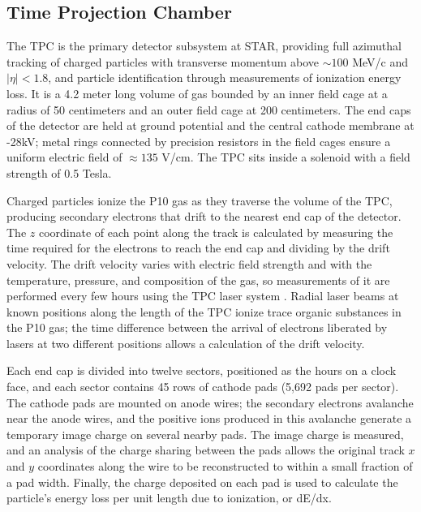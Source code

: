 
\subsection{Time Projection Chamber}

The TPC \cite{Anderson:2003ur} is the primary detector subsystem at STAR,
providing full azimuthal tracking of charged particles with transverse
momentum above $\sim 100$ MeV/c and $|\eta| < 1.8$, and particle
identification through measurements of ionization energy loss. It is a 4.2
meter long volume of gas bounded by an inner field cage at a radius of 50
centimeters and an outer field cage at 200 centimeters. The end caps of the
detector are held at ground potential and the central cathode membrane at
-28kV; metal rings connected by precision resistors in the field cages ensure
a uniform electric field of $\approx 135$ V/cm. The TPC sits inside a solenoid
with a field strength of 0.5 Tesla.

Charged particles ionize the P10 gas as they traverse the volume of the TPC,
producing secondary electrons that drift to the nearest end cap of the
detector. The $z$ coordinate of each point along the track is calculated by
measuring the time required for the electrons to reach the end cap and
dividing by the drift velocity. The drift velocity varies with electric field
strength and with the temperature, pressure, and composition of the gas, so
measurements of it are performed every few hours using the TPC laser system
\cite{Abele:2003aa}. Radial laser beams at known positions along the length of
the TPC ionize trace organic substances in the P10 gas; the time difference
between the arrival of electrons liberated by lasers at two different
positions allows a calculation of the drift velocity.

Each end cap is divided into twelve sectors, positioned as the hours on a
clock face, and each sector contains 45 rows of cathode pads (5,692 pads per
sector). The cathode pads are mounted on anode wires; the secondary electrons
avalanche near the anode wires, and the positive ions produced in this
avalanche generate a temporary image charge on several nearby pads. The image
charge is measured, and an analysis of the charge sharing between the pads
allows the original track $x$ and $y$ coordinates along the wire to be
reconstructed to within a small fraction of a pad width. Finally, the charge
deposited on each pad is used to calculate the particle's energy loss per unit
length due to ionization, or dE/dx.

